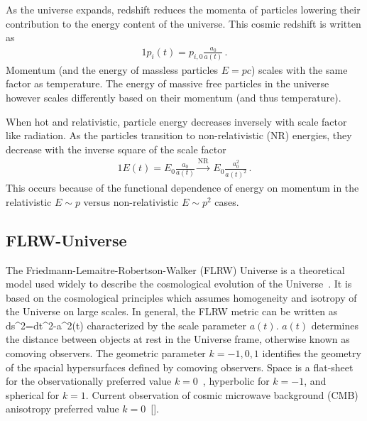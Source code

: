 As the universe expands, redshift reduces the momenta of particles lowering their contribution to the energy content of the universe. This cosmic redshift is written as
\begin{alignat}{1}
 \label{Redshift} p_{i}(t) = p_{i,0}\frac{a_{0}}{a(t)}\,.
\end{alignat}
Momentum (and the energy of massless particles $E=pc$) scales with the same factor as temperature. The energy of massive free particles in the universe however scales differently based on their momentum (and thus temperature).

When hot and relativistic, particle energy decreases inversely with scale factor like radiation. As the particles transition to non-relativistic (NR) energies, they decrease with the inverse square of the scale factor
\begin{alignat}{1}
 \label{EScale} E(t) = E_{0}\frac{a_{0}}{a(t)}\xrightarrow{\mathrm{NR}}\ E_{0}\frac{a_{0}^{2}}{a(t)^{2}}\,.
\end{alignat}
This occurs because of the functional dependence of energy on momentum in the relativistic $E\sim p$ versus non-relativistic $E\sim p^{2}$ cases.

\subsection{FLRW-Universe}
The Friedmann-Lemaitre-Robertson-Walker (FLRW) Universe is a theoretical model used widely to describe the cosmological evolution of the Universe~\cite{hartle2003gravity,hobson,misner1973gravitation}. It is based on the cosmological principles which assumes homogeneity and isotropy of the Universe on large scales. In general, the FLRW metric can be written as
\beqn\label{metric}
ds^2=dt^2-a^2(t)%
\eeqn
characterized by the scale parameter $a(t)$. $a(t)$ determines the distance between objects at rest in the Universe frame, otherwise known as comoving observers. The geometric parameter $k=-1,0,1$ identifies the geometry of the spacial hypersurfaces defined by comoving observers. Space is a flat-sheet for the observationally preferred value $k=0$~\cite{Planck}, hyperbolic for $k=-1$, and spherical for $k=1$. Current observation of cosmic microwave background (CMB) anisotropy preferred value $k=0$~[\cite{Planck:2013pxb,Planck:2015fie,Planck:2018vyg}].

